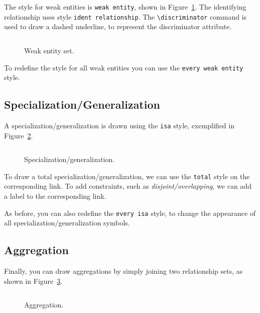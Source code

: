 \documentclass[12pt]{article}
\newcommand{\demo}[1]{
  \bigskip
  \begin{minipage}{\linewidth}
      \begin{center}
          
      \end{center}
      \begin{center}
          \scriptsize
          \inputminted{latex}{snippets/#1.tex}
      \end{center}
  \end{minipage}
}
\begin{document}
The style for weak entities is \texttt{weak entity}, shown in
Figure~\ref{fig:weak}. The identifying relationship uses style
\texttt{ident relationship}. The \verb+\discriminator+ command is used to
draw a dashed underline, to represent the discriminator attribute.

\begin{figure}[htb!]
    \centering
    \demo{weak}
    \caption{Weak entity set.}
\label{fig:weak}
\end{figure}

To redefine the style for all weak entities you can use the \texttt{every weak
  entity} style.

%

\subsection{Specialization/Generalization}
\label{sec:spec}

A specialization/generalization is drawn using the \texttt{isa} style,
exemplified in Figure~\ref{fig:isa}.

\begin{figure}[htb!]
    \centering
    \demo{isa}
    \caption{Specialization/generalization.}
\label{fig:isa}
\end{figure}

To draw a total specialization/generalization, we can use the \texttt{total}
style on the corresponding link.  To add constraints, such as
\emph{disjoint/overlapping}, we can add a label to the corresponding link.

As before, you can also redefine the \texttt{every isa} style, to change the
appearance of all specialization/generalization symbols.

\subsection{Aggregation}
\label{sec:aggregation}

Finally, you can draw aggregations by simply joining two relationship sets, as
shown in Figure~\ref{fig:aggregation}.

\begin{figure}[htb!]
    \centering
    \demo{aggregation}
    \caption{Aggregation.}
    \label{fig:aggregation}
\end{figure}
\end{document}
